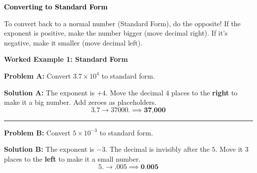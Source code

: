 \documentclass[12pt, letterpaper, fleqn]{article}
\begin{document}
\newpage

\begin{tcolorbox}[colback=customteal!20]
\large\textcolor{black}{\textbf{Converting to Standard Form}}
\end{tcolorbox}

\noindent
To convert back to a normal number (Standard Form), do the opposite! If the exponent is positive, make the number bigger (move decimal right). If it's negative, make it smaller (move decimal left).

\vspace{3mm}

\begin{tcolorbox}[colback=white, colframe=black!25, boxrule=0.6pt, arc=4mm, left=6mm, right=6mm, top=5mm, bottom=5mm]

\textbf{Worked Example 1: Standard Form}

\medskip

\textbf{Problem A:} Convert $3.7 \times 10^4$ to standard form.

\medskip

\textbf{Solution A:} The exponent is $+4$. Move the decimal $4$ places to the \textbf{right} to make it a big number. Add zeroes as placeholders.
\[ 3.7 \rightarrow 37000. \implies \textbf{37,000} \]

\medskip
\hrule
\medskip

\textbf{Problem B:} Convert $5 \times 10^{-3}$ to standard form.

\medskip

\textbf{Solution B:} The exponent is $-3$. The decimal is invisibly after the $5$. Move it $3$ places to the \textbf{left} to make it a small number.
\[ 5. \rightarrow .005 \implies \textbf{0.005} \]

\end{tcolorbox}

\vspace{4mm}
\end{document}
